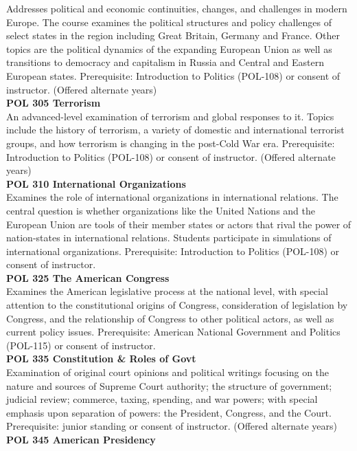 \documentclass[
  letterpaper,
]{scrbook}
\begin{document}
Addresses political and economic continuities, changes, and challenges
in modern Europe. The course examines the political structures and
policy challenges of select states in the region including Great
Britain, Germany and France. Other topics are the political dynamics of
the expanding European Union as well as transitions to democracy and
capitalism in Russia and Central and Eastern European states.
Prerequisite: Introduction to Politics (POL-108) or consent of
instructor. (Offered alternate years)\\
\textbf{POL 305 Terrorism}\\
An advanced-level examination of terrorism and global responses to it.
Topics include the history of terrorism, a variety of domestic and
international terrorist groups, and how terrorism is changing in the
post-Cold War era. Prerequisite: Introduction to Politics (POL-108) or
consent of instructor. (Offered alternate years)\\
\textbf{POL 310 International Organizations}\\
Examines the role of international organizations in international
relations. The central question is whether organizations like the United
Nations and the European Union are tools of their member states or
actors that rival the power of nation-states in international relations.
Students participate in simulations of international organizations.
Prerequisite: Introduction to Politics (POL-108) or consent of
instructor.\\
\textbf{POL 325 The American Congress}\\
Examines the American legislative process at the national level, with
special attention to the constitutional origins of Congress,
consideration of legislation by Congress, and the relationship of
Congress to other political actors, as well as current policy issues.
Prerequisite: American National Government and Politics (POL-115) or
consent of instructor.\\
\textbf{POL 335 Constitution \& Roles of Govt}\\
Examination of original court opinions and political writings focusing
on the nature and sources of Supreme Court authority; the structure of
government; judicial review; commerce, taxing, spending, and war powers;
with special emphasis upon separation of powers: the President,
Congress, and the Court. Prerequisite: junior standing or consent of
instructor. (Offered alternate years)\\
\textbf{POL 345 American Presidency}\\
\end{document}
